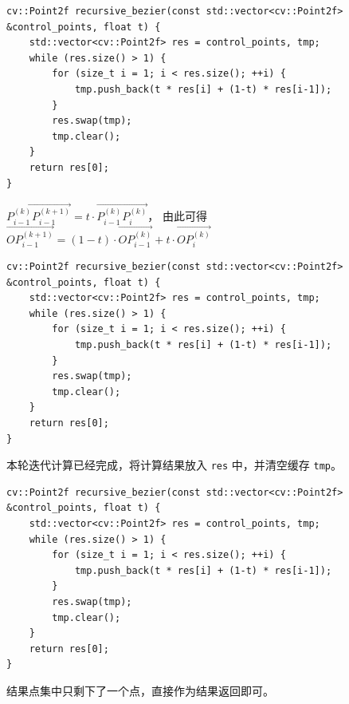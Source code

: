 \documentclass{ctexbeamer}
\begin{document}
    \begin{frame}[fragile]

        {
            \small
            \begin{verbatim}
cv::Point2f recursive_bezier(const std::vector<cv::Point2f> &control_points, float t) {
    std::vector<cv::Point2f> res = control_points, tmp;
    while (res.size() > 1) {
        for (size_t i = 1; i < res.size(); ++i) {
            tmp.push_back(t * res[i] + (1-t) * res[i-1]);
        }
        res.swap(tmp);
        tmp.clear();
    }
    return res[0];
}
            \end{verbatim}
        }

        \parbox[c][0.2\textheight][c]{\textwidth}{
            $\overrightarrow{P^{(k)}_{i-1}P^{(k+1)}_{i-1}} = t\cdot\overrightarrow{P^{(k)}_{i-1}P^{(k)}_i}$，
            由此可得 $\overrightarrow{OP^{(k+1)}_{i-1}} = (1-t)\cdot\overrightarrow{OP^{(k)}_{i-1}} + t\cdot\overrightarrow{OP^{(k)}_i}$
        }

    \end{frame}

    \begin{frame}[fragile]

        {
            \small
            \begin{verbatim}
cv::Point2f recursive_bezier(const std::vector<cv::Point2f> &control_points, float t) {
    std::vector<cv::Point2f> res = control_points, tmp;
    while (res.size() > 1) {
        for (size_t i = 1; i < res.size(); ++i) {
            tmp.push_back(t * res[i] + (1-t) * res[i-1]);
        }
        res.swap(tmp);
        tmp.clear();
    }
    return res[0];
}
            \end{verbatim}
        }

        \parbox[c][0.2\textheight][c]{\textwidth}{
            本轮迭代计算已经完成，将计算结果放入 \texttt{res} 中，并清空缓存 \texttt{tmp}。
        }

    \end{frame}

    \begin{frame}[fragile]

        {
            \small
            \begin{verbatim}
cv::Point2f recursive_bezier(const std::vector<cv::Point2f> &control_points, float t) {
    std::vector<cv::Point2f> res = control_points, tmp;
    while (res.size() > 1) {
        for (size_t i = 1; i < res.size(); ++i) {
            tmp.push_back(t * res[i] + (1-t) * res[i-1]);
        }
        res.swap(tmp);
        tmp.clear();
    }
    return res[0];
}
            \end{verbatim}
        }

        \parbox[c][0.2\textheight][c]{\textwidth}{
            结果点集中只剩下了一个点，直接作为结果返回即可。
        }
    \end{frame}
\end{document}
